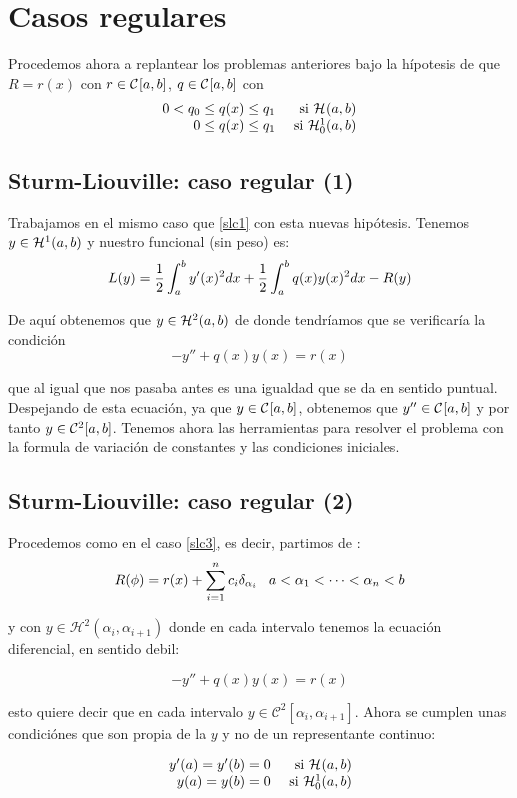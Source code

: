 \section{Casos regulares}

Procedemos ahora a replantear los problemas anteriores bajo la
hípotesis de que $R=r(x)$ con $r\in\continuas$, $q\in\continuas$ con
\[
\begin{array}{rr}
0<q_0\leq q(x)\leq q_1 & \text{ si } \sobolev{}\\
0\leq q(x) \leq q_1    & \text{ si } \sobolevcero{1}
\end{array}
\]
\subsection{Sturm-Liouville: caso regular (1)}

Trabajamos en el mismo caso que \eqref{slc1} con esta nuevas
hipótesis. Tenemos $y\in\sobolev{1}$ y nuestro funcional (sin peso)
es:
\[
L(y)=\frac{1}{2}\integral{a}{b}{y'(x)^2dx}+\frac{1}{2}\integral{a}{b}{q(x)y(x)^2dx}-R(y)
\]

De aquí obtenemos que $y\in\sobolev{2}$ de donde tendríamos que se verificaría la condición
\[
 -y'' + q(x)y(x) = r(x)
\]

que al igual que nos pasaba antes es una igualdad que se da en sentido
puntual. Despejando de esta ecuación, ya que $y\in\continuas$,
obtenemos que $y''\in\continuas$ y por tanto
$y\in\continuas[2]$. Tenemos ahora las herramientas para resolver el
problema con la formula de variación de constantes y las condiciones
iniciales.

\subsection{Sturm-Liouville: caso regular (2)}

Procedemos como en el caso \eqref{slc3}, es decir, partimos de :
\[
R(\phi)=r(x)+\sum_{i=1}^nc_i\delta_{\alpha_i} \espacio a<\alpha_1<\cdots<\alpha_n<b
\]

y con $y\in\mathcal{H}^2(\alpha_i,\alpha_{i+1})$ donde en cada intervalo tenemos la ecuación diferencial, en sentido debil:

\[
 -y'' + q(x)y(x) = r(x)
\]

esto quiere decir que en cada intervalo
$y\in\mathcal{C}^2[\alpha_i,\alpha_{i+1}]$. Ahora se cumplen unas
condiciónes que son propia de la $y$ y no de un representante continuo:

\[
\begin{array}{rr}
y'(a) = y'(b) = 0 & \text{ si } \sobolev{}\\
y(a) = y(b) = 0    & \text{ si } \sobolevcero{1}
\end{array}
\]

